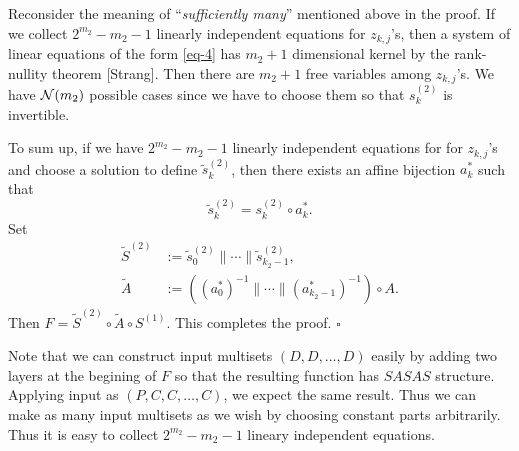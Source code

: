 \documentclass{ieeeaccess}
\begin{document}
Reconsider the meaning of ``{\it sufficiently many}'' mentioned  above in the proof.
If we collect $2^{m_2}-m_2-1$ linearly independent equations for $z_{k,j}$'s,
then a system of linear equations of the form \eqref{eq-4}
has $m_2+1$ dimensional kernel by the rank-nullity theorem [Strang].
Then there are $m_2+1$ free variables among $z_{k,j}$'s.
We have ${\cal N}(m_2)$ possible cases since we have to choose
them so that $s_k^{(2)}$ is invertible.

To sum up, if we have $2^{m_2}-m_2-1$ linearly independent equations for for $z_{k,j}$'s
and choose a solution to define $\tilde s_k^{(2)}$, then
there exists an affine bijection $a_k^*$ such that
\[
\tilde s_k^ {(2)} = s_k^{(2)} \circ a_k^*.
\]
Set 
\begin{align*}
\tilde S^{(2)} & := \tilde s_0^{(2)} \| \cdots \| \tilde s_{k_2-1}^{(2)}, \\
\tilde A &:= \left((a_0^*)^{-1} \| \cdots \| (a_{k_2-1}^*)^{-1}\right)\circ A.
\end{align*}
Then
$ F = {\tilde{S}^{(2)}} \circ \tilde A \circ S^{(1)}$.
This completes the proof. \hfill $\square$

Note that we can construct input multisets $(D,D,\ldots, D)$ easily
by adding two layers at the begining of $F$ so that
the resulting function has $SASAS$ structure.
Applying input as $(P, C, C,\ldots, C)$, we expect the same result.
Thus we can make as many input multisets as we wish 
by choosing constant parts arbitrarily.
Thus it is easy to collect $2^{m_2}-m_2-1$ lineary independent equations.
\end{document}
